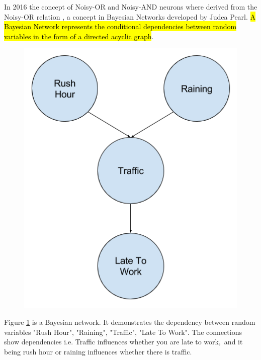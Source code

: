 In 2016 the concept of Noisy-OR and Noisy-AND neurons \cite{LearningLogicalActivations} where derived from the Noisy-OR relation \cite{russell1995modern}, a concept in Bayesian Networks developed by Judea Pearl. \hl{A Bayesian Network represents the conditional dependencies between random variables in the form of a directed acyclic graph}.

\begin{figure}[H]
	\centering
	\begin{minipage}[b]{0.4\textwidth}
		\includegraphics[width=\textwidth]{bayesian-network-example.png}
		\caption{}
		\label{fig:bayesian-network-example}
	\end{minipage}
	\hfill
\end{figure}

Figure \ref{fig:bayesian-network-example} is a Bayesian network. It demonstrates the dependency between random variables "Rush Hour", "Raining", "Traffic", "Late To Work". The connections show dependencies i.e. Traffic influences whether you are late to work,\ and it being rush hour or raining influences whether there is traffic.\\

